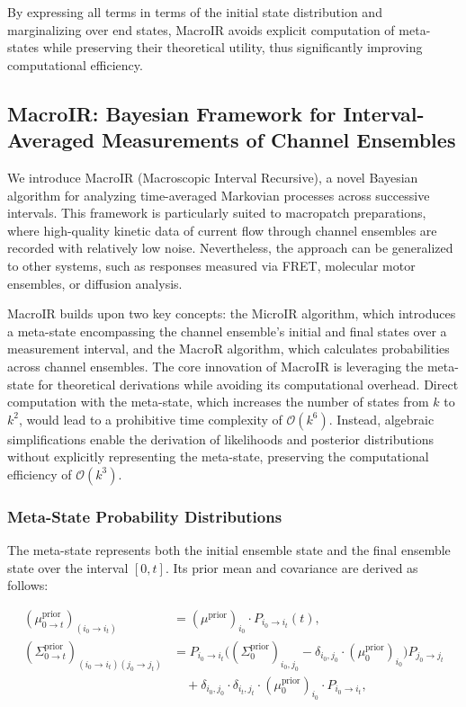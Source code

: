 \documentclass[pdflatex,sn-mathphys-num]{sn-jnl}%
\theoremstyle{thmstyleone}%
\theoremstyle{thmstyletwo}%
\theoremstyle{thmstylethree}%
\begin{document}
By expressing all terms in terms of the initial state distribution and marginalizing over end states, MacroIR avoids explicit computation of meta-states while preserving their theoretical utility, thus significantly improving computational efficiency.



\subsection{MacroIR: Bayesian Framework for Interval-Averaged Measurements of Channel Ensembles}

We introduce MacroIR (Macroscopic Interval Recursive), a novel Bayesian algorithm for analyzing time-averaged Markovian processes across successive intervals. This framework is particularly suited to macropatch preparations, where high-quality kinetic data of current flow through channel ensembles are recorded with relatively low noise. Nevertheless, the approach can be generalized to other systems, such as responses measured via FRET, molecular motor ensembles, or diffusion analysis.

MacroIR builds upon two key concepts: the MicroIR algorithm, which introduces a meta-state encompassing the channel ensemble's initial and final states over a measurement interval, and the MacroR algorithm, which calculates probabilities across channel ensembles. The core innovation of MacroIR is leveraging the meta-state for theoretical derivations while avoiding its computational overhead. Direct computation with the meta-state, which increases the number of states from \( k \) to \( k^2 \), would lead to a prohibitive time complexity of \( \mathcal{O}(k^6) \). Instead, algebraic simplifications enable the derivation of likelihoods and posterior distributions without explicitly representing the meta-state, preserving the computational efficiency of \( \mathcal{O}(k^3) \).

\subsubsection{ Meta-State Probability Distributions}

The meta-state represents both the initial ensemble state and the final ensemble state over the interval \([0, t]\). Its prior mean and covariance are derived as follows:

\begin{align}
	(\mu^{\text{prior}}_{0 \rightarrow t})_{(i_0 \rightarrow i_t)} &= (\mu^{\text{prior}})_{i_0} \cdot P_{i_0 \rightarrow i_t}(t), \label{eq:meta_mean_prior} \\
	(\Sigma^{\text{prior}}_{0 \rightarrow t})_{(i_0 \rightarrow i_t)(j_0 \rightarrow j_t)} &= 
	P_{i_0 \rightarrow i_t} \big( (\Sigma^{\text{prior}}_0)_{i_0, j_0} - \delta_{i_0, j_0} \cdot (\mu^{\text{prior}}_0)_{i_0} \big) P_{j_0 \rightarrow j_t} \nonumber \\
	&\quad + \delta_{i_0, j_0} \cdot \delta_{i_t, j_t} \cdot (\mu^{\text{prior}}_0)_{i_0} \cdot P_{i_0 \rightarrow i_t}, \label{eq:meta_covariance_prior}
\end{align}
\end{document}
